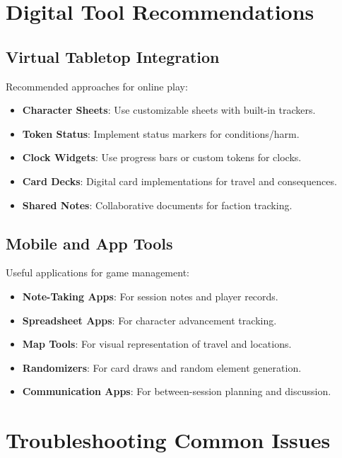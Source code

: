 \section{Digital Tool Recommendations}
\label{sec:digital-tools}

\subsection{Virtual Tabletop Integration}
\label{subsec:vtt-tools}

Recommended approaches for online play:

\begin{itemize}
\item \textbf{Character Sheets}: Use customizable sheets with built-in trackers.
\item \textbf{Token Status}: Implement status markers for conditions/harm.
\item \textbf{Clock Widgets}: Use progress bars or custom tokens for clocks.
\item \textbf{Card Decks}: Digital card implementations for travel and consequences.
\item \textbf{Shared Notes}: Collaborative documents for faction tracking.
\end{itemize}

\subsection{Mobile and App Tools}
\label{subsec:mobile-tools}

Useful applications for game management:

\begin{itemize}
\item \textbf{Note-Taking Apps}: For session notes and player records.
\item \textbf{Spreadsheet Apps}: For character advancement tracking.
\item \textbf{Map Tools}: For visual representation of travel and locations.
\item \textbf{Randomizers}: For card draws and random element generation.
\item \textbf{Communication Apps}: For between-session planning and discussion.
\end{itemize}

\section{Troubleshooting Common Issues}
\label{sec:troubleshooting}

